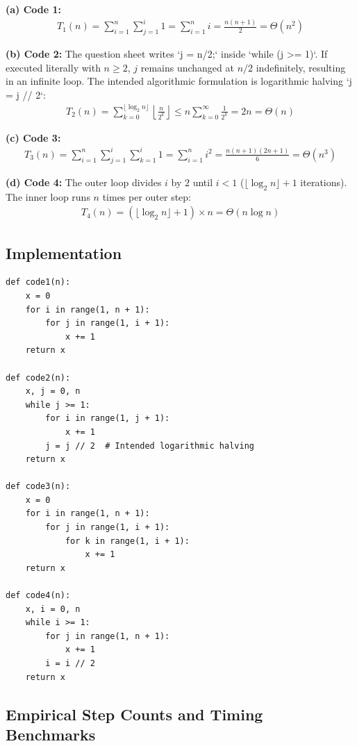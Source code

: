 \documentclass[12pt]{article}
\begin{document}
\textbf{(a) Code 1:}
\begin{align*}
    T_1(n) = \sum_{i=1}^n \sum_{j=1}^i 1 = \sum_{i=1}^n i = \frac{n(n+1)}{2} = \Theta(n^2)
\end{align*}

\textbf{(b) Code 2:}
The question sheet writes `j = n/2;` inside `while (j >= 1)`. If executed literally with $n \ge 2$, $j$ remains unchanged at $n/2$ indefinitely, resulting in an infinite loop. The intended algorithmic formulation is logarithmic halving `j = j // 2`:
\begin{align*}
    T_2(n) = \sum_{k=0}^{\lfloor \log_2 n \rfloor} \left\lfloor \frac{n}{2^k} \right\rfloor \le n \sum_{k=0}^\infty \frac{1}{2^k} = 2n = \Theta(n)
\end{align*}

\textbf{(c) Code 3:}
\begin{align*}
    T_3(n) = \sum_{i=1}^n \sum_{j=1}^i \sum_{k=1}^i 1 = \sum_{i=1}^n i^2 = \frac{n(n+1)(2n+1)}{6} = \Theta(n^3)
\end{align*}

\textbf{(d) Code 4:} The outer loop divides $i$ by $2$ until $i < 1$ ($\lfloor \log_2 n \rfloor + 1$ iterations). The inner loop runs $n$ times per outer step:
\begin{align*}
    T_4(n) = (\lfloor \log_2 n \rfloor + 1) \times n = \Theta(n \log n)
\end{align*}

\subsection{Implementation}
\begin{lstlisting}[style=code]
def code1(n):
    x = 0
    for i in range(1, n + 1):
        for j in range(1, i + 1):
            x += 1
    return x

def code2(n):
    x, j = 0, n
    while j >= 1:
        for i in range(1, j + 1):
            x += 1
        j = j // 2  # Intended logarithmic halving
    return x

def code3(n):
    x = 0
    for i in range(1, n + 1):
        for j in range(1, i + 1):
            for k in range(1, i + 1):
                x += 1
    return x

def code4(n):
    x, i = 0, n
    while i >= 1:
        for j in range(1, n + 1):
            x += 1
        i = i // 2
    return x
\end{lstlisting}

\subsection{Empirical Step Counts and Timing Benchmarks}
\end{document}
